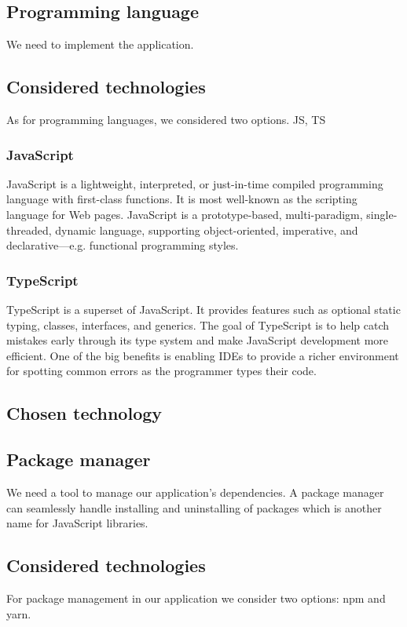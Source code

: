 \subsection{Programming language}
We need to implement the application.

\subsection*{Considered technologies}
As for programming languages, we considered two options. 
JS, TS

\subsubsection*{JavaScript}
JavaScript is a lightweight, interpreted, or just-in-time compiled programming language with first-class functions. 
It is most well-known as the scripting language for Web pages. 
JavaScript is a prototype-based, multi-paradigm, single-threaded, dynamic language, supporting object-oriented, imperative, and declarative---e.g. functional programming styles.

\subsubsection*{TypeScript}
TypeScript is a superset of JavaScript. 
It provides features such as optional static typing, classes, interfaces, and generics. 
The goal of TypeScript is to help catch mistakes early through its type system and make JavaScript development more efficient. 
One of the big benefits is enabling IDEs to provide a richer environment for spotting common errors as the programmer types their code.

\subsection*{Chosen technology}


\subsection{Package manager}
We need a tool to manage our application's dependencies.
A package manager can seamlessly handle installing and uninstalling of packages which is another name for JavaScript libraries.

\subsection*{Considered technologies}
For package management in our application we consider two options: npm and yarn.

